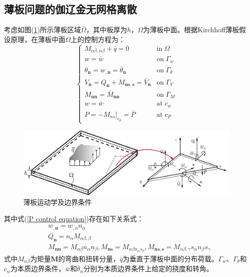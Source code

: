 \subsection{薄板问题的伽辽金无网格离散}
考虑如图(\ref{plate})所示薄板区域$\bar \Omega$，其中板厚为$h$，$\Omega$为薄板中面。根据Kirchhoff薄板假设原理\cite{Liu}，在薄板中面$\Omega$上的控制方程为：
\begin{equation}
    \begin{cases}\label{P control equation}
        M_{\alpha\beta,\alpha\beta}+\bar q=0&\mathrm{in} \; \Omega\\
        w=\bar w&\mathrm{on}\;\Gamma_w\\
        \theta_{\pmb n}=w_{,\pmb n}=\bar \theta_{\pmb n}&\mathrm{on}\;\Gamma_{\theta}\\
        V_{\pmb n}=Q_{\pmb n}+M_{\pmb{ns},\pmb s}=\bar V_{\pmb n}&\mathrm{on}\;\Gamma_V\\
        M_{\pmb{nn}}=\bar M_{\pmb{nn}}&\mathrm{on}\; \Gamma_M\\
        w=\bar w&\mathrm{at} \; c_w\\
        P=-M_{ns}\vert_{c_p}=\bar P&\mathrm{at}\; c_P
    \end{cases}
\end{equation}
\begin{figure}[H]
    \centering
    \includegraphics[scale=0.7]{figure/nomesh/plate.png}
    \caption{薄板运动学及边界条件}\label{plate}
\end{figure}
\noindent
其中式(\ref{P control equation})存在如下关系式：
\begin{align}
\label{wn} &w_{,\pmb n}=w_{,\alpha}n_{\alpha}\\
\label{Qn} &Q_{\pmb n}=n_{\alpha}M_{\alpha\beta,\beta}\\
\label{Mn} &M_{\pmb{nn}}=M_{\alpha\beta}n_{\alpha}n_{\beta},M_{\pmb{ns}}=M_{\alpha\beta n_{\alpha}s_{\beta}},M_{\pmb{ns,s}}=M_{\alpha\beta,\gamma}s_{\alpha}n_{\beta}s_{\gamma}
\end{align}
式中$M_{\alpha\beta}$为矩量$\boldsymbol M$的弯曲和扭转分量，$\bar q$为垂直于薄板中面的分布荷载。$\Gamma_w$、$\Gamma_{\theta}$和$c_w$为本质边界条件，$\bar w$和$\bar \theta_n$分别为本质边界条件上给定的挠度和转角。
